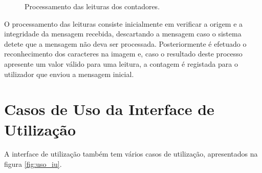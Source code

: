 \begin{figure}[h!]
\begin{center}
\caption{Processamento das leituras dos contadores.}
\label{fig:state_processamento}
\end{center}
\end{figure}

O processamento das leituras consiste inicialmente em verificar a origem e a integridade da mensagem recebida, descartando a mensagem caso o sistema detete que a mensagem não deva ser processada. Posteriormente é efetuado o reconhecimento dos caracteres na imagem e, caso o resultado deste processo apresente um valor válido para uma leitura, a contagem é registada para o utilizador que enviou a mensagem inicial.

\section{Casos de Uso da Interface de Utilização} \label{sec:casos_iu}
A interface de utilização também tem vários casos de utilização, apresentados na figura \ref{fig:uso_iu}.

